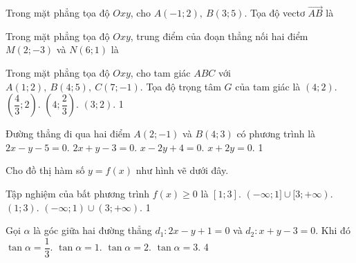 \NQuestion Trong mặt phẳng tọa độ $Oxy$, cho $A(-1;2),\ B(3;5)$. Tọa độ vectơ $\overrightarrow{AB}$ là

\NQuestion Trong mặt phẳng tọa độ $Oxy$, trung điểm của đoạn thẳng nối hai điểm $M(2;-3)$ và $N(6;1)$ là

\NQuestion Trong mặt phẳng tọa độ $Oxy$, cho tam giác $ABC$ với $A(1;2),\ B(4;5),\ C(7;-1)$. Tọa độ trọng tâm $G$ của tam giác là
\ChoicesOneLine
{$\left(4;2\right)$.}
{$\left(\dfrac{4}{3};2\right)$.}
{$\left(4;\dfrac{2}{3}\right)$.}
{$\left(3;2\right)$.}
{1}

\NQuestion Đường thẳng đi qua hai điểm $A(2;-1)$ và $B(4;3)$ có phương trình là
\ChoicesOneLine
{$2x-y-5=0$.}
{$2x+y-3=0$.}
{$x-2y+4=0$.}
{$x+2y=0$.}
{1}

\NQuestion Cho đồ thị hàm số $y=f\left(x\right)$ như hình vẽ dưới đây.
\begin{center}
    
\end{center}
Tập nghiệm của bất phương trình $f\left(x\right)\ge 0$ là
\ChoicesOneLine
{$[1;3]$.}
{$(-\infty;1]\cup[3;+\infty)$.}
{$(1;3)$.}
{$(-\infty;1)\cup(3;+\infty)$.}
{1}

\NQuestion Gọi $\alpha$ là góc giữa hai đường thẳng $d_1:2x-y+1=0$ và $d_2:x+y-3=0$. Khi đó
\ChoicesOneLine
{$\tan\alpha=\dfrac13$.}
{$\tan\alpha=1$.}
{$\tan\alpha=2$.}
{$\tan\alpha=3$.}
{4}
